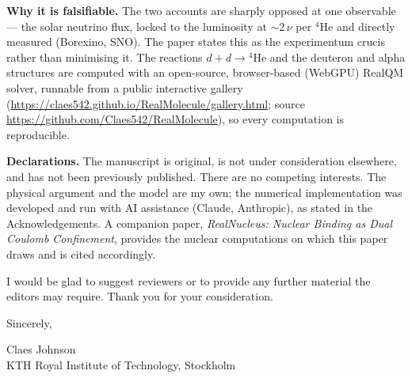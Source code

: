 \documentclass[11pt]{article}
\begin{document}
\medskip
\textbf{Why it is falsifiable.} The two accounts are sharply opposed at one observable --- the solar
neutrino flux, locked to the luminosity at ${\sim}2\,\nu$ per ${}^4$He and directly measured (Borexino,
SNO). The paper states this as the experimentum crucis rather than minimising it. The reactions
$d+d\to{}^4$He and the deuteron and alpha structures are computed with an open-source, browser-based
(WebGPU) RealQM solver, runnable from a public interactive gallery
(\url{https://claes542.github.io/RealMolecule/gallery.html}; source
\url{https://github.com/Claes542/RealMolecule}), so every computation is reproducible.

\medskip
\textbf{Declarations.} The manuscript is original, is not under consideration elsewhere, and has not
been previously published. There are no competing interests. The physical argument and the model are my
own; the numerical implementation was developed and run with AI assistance (Claude, Anthropic), as
stated in the Acknowledgements. A companion paper, \emph{RealNucleus: Nuclear Binding as Dual Coulomb
Confinement}, provides the nuclear computations on which this paper draws and is cited accordingly.

\medskip
I would be glad to suggest reviewers or to provide any further material the editors may require. Thank
you for your consideration.

\bigskip
\noindent Sincerely,

\medskip
\noindent Claes Johnson\\
KTH Royal Institute of Technology, Stockholm
\end{document}
